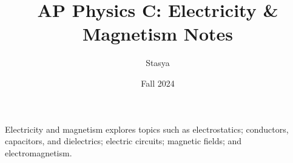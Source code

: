 \documentclass[10pt,a4paper,oneside]{book}
\title{AP Physics C: Electricity \& Magnetism Notes}
\author{Stasya}
\date{Fall 2024}
\begin{document}
\maketitle

\bigbreak
\begin{center}
    Electricity and magnetism explores topics such as electrostatics; conductors, capacitors, and dielectrics; 
electric circuits; magnetic fields; and electromagnetism.
\end{center}
\bigbreak

\tableofcontents






\end{document}
